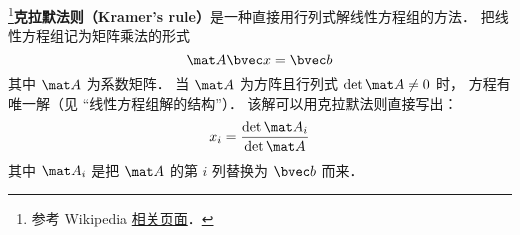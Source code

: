 

\footnote{参考 Wikipedia \href{https://en.wikipedia.org/wiki/Cramer's_rule}{相关页面}．}\textbf{克拉默法则（Kramer's rule）}是一种直接用行列式解线性方程组的方法． 把线性方程组记为矩阵乘法的形式
\begin{equation}
\mat A \bvec x = \bvec b
\end{equation}
其中 $\mat A$ 为系数矩阵． 当 $\mat A$ 为方阵且行列式 $\det{\mat A} \ne 0$ 时， 方程有唯一解（见 “线性方程组解的结构”）． 该解可以用克拉默法则直接写出：
\begin{equation}
x_i = \frac{\det{\mat A_i}}{\det{\mat A}}
\end{equation}
其中 $\mat A_i$ 是把 $\mat A$ 的第 $i$ 列替换为 $\bvec b$ 而来．
